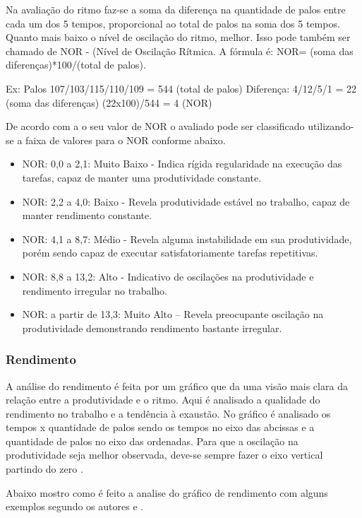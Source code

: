 Na avaliação do ritmo faz-se a soma da diferença na quantidade de palos entre cada um dos 5 tempos, proporcional ao total de palos na soma dos 5 tempos. Quanto mais baixo o nível de oscilação do ritmo, melhor. Isso pode também ser chamado de NOR - (Nível de Oscilação Rítmica. A fórmula é: NOR= (soma das diferenças)*100/(total de palos).\cite{marcosjaime2013} 

Ex: Palos 107/103/115/110/109 = 544 (total de palos)
Diferença: 4/12/5/1 = 22 (soma das diferenças)
(22x100)/544 = 4 (NOR)

De acordo com a o seu valor de NOR o avaliado pode ser classificado utilizando-se a faixa de valores para o NOR conforme abaixo. \cite{marcosjaime2013}

\begin{itemize}
\item NOR: 0,0 a 2,1: Muito Baixo - Indica rígida regularidade na execução das tarefas, capaz de manter uma produtividade constante.
\item NOR: 2,2 a 4,0: Baixo - Revela produtividade estável no trabalho, capaz de manter rendimento constante.
\item NOR: 4,1 a 8,7: Médio - Revela alguma instabilidade em sua produtividade, porém sendo capaz de executar satisfatoriamente tarefas repetitivas.
\item NOR: 8,8 a 13,2: Alto - Indicativo de oscilações na produtividade e rendimento irregular no trabalho.
\item NOR: a partir de 13,3: Muito Alto – Revela preocupante oscilação na produtividade demonstrando rendimento bastante irregular.
\end{itemize}

\subsubsection{Rendimento}
\label{subsub:rend}

A análise do rendimento é feita por um gráfico que da uma visão mais clara da relação entre a produtividade e o ritmo. Aqui é analisado a qualidade do rendimento no trabalho e a tendência à exaustão. No gráfico é analisado os tempos x quantidade de palos sendo os tempos no eixo das abcissas e a quantidade de palos no eixo das ordenadas. Para que a oscilação na produtividade seja melhor observada, deve-se sempre fazer o eixo vertical partindo do zero \cite{psicohood2018}.

Abaixo mostro como é feito a analise do gráfico de rendimento com alguns exemplos segundo os autores \cite{psicohood2018} e \cite{manualPsico2010}.

